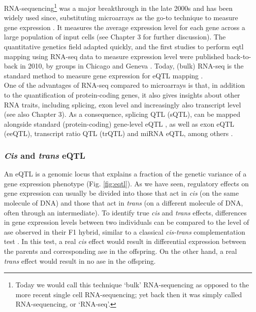 RNA-sequencing\footnote{Today we would call this technique `bulk' RNA-sequencing as opposed to the more recent single cell RNA-sequencing; yet back then it was simply called RNA-sequencing, or `RNA-seq'.} was a major breakthrough in the late 2000s 
and has been widely used since, substituting microarrays as the go-to technique to measure gene expression \cite{weber2015discovering}.
It measures the average expression level for each gene across a large population 
of input cells (see Chapter 3 for further discussion).
The quantitative genetics field adapted quickly, and the first studies to perform \gls{eqtl} mapping using RNA-seq data to measure expression level were published back-to-back in 2010, by groups in Chicago and Geneva
\cite{montgomery2010transcriptome, pickrell2010understanding}.
Today, (bulk) RNA-seq is the standard method to measure gene expression for eQTL mapping \cite{lappalainen2013transcriptome, gtex2015genotype, chen2016genetic}.\\

One of the advantages of RNA-seq compared to microarrays is that, in addition to the quantification of protein-coding genes, it also  gives insights about other RNA traits, including splicing, exon level and increasingly also transcript level (see also Chapter
3).
As a consequence, splicing QTL (sQTL), can be mapped alongside standard (protein-coding) gene-level eQTL \cite{pickrell2010understanding, montgomery2010transcriptome}, as well as exon eQTL (eeQTL), transcript ratio QTL (trQTL) and miRNA eQTL, among others \cite{lappalainen2013transcriptome, bonder2019systematic}.
 
\subsubsection{\textit{Cis} and \textit{trans} eQTL}

An eQTL is a genomic locus that explains a fraction of the genetic variance of a gene expression phenotype (Fig. \ref{fig:eqtl}). 
As we have seen, regulatory effects on gene expression can usually be divided into those that act in \textit{cis} (on the same molecule of DNA) and those that act in \textit{trans} (on a different molecule of DNA, often through an intermediate).
To identify true \textit{cis} and \textit{trans} effects, differences in gene expression levels between two individuals can be compared to the level of \gls{ase} observed in their F1 hybrid, similar to a classical \textit{cis-trans} complementation test \cite{mcmanus2010regulatory, goncalves2012extensive}. 
In this test, a real \textit{cis} effect would result in differential expression between the parents and corresponding \gls{ase} in the offspring. 
On the other hand, a real \textit{trans} effect would result in no \gls{ase} in the offspring. \\

